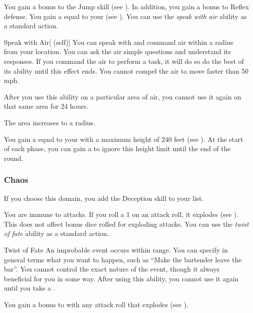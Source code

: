              You gain a  bonus to the Jump skill (see ).
            In addition, you gain a  bonus to Reflex defense.
             You gain a  equal to your  (see ).
             You can use the \textit{speak with air} ability as a standard action.
            \begin{attuneability}{Speak with Air}[ (self)]
                You can speak with and command air within a \areahuge radius  from your location.
                You can ask the air simple questions and understand its responses.
                If you command the air to perform a task, it will do so do the best of its ability until this effect ends.
                You cannot compel the air to move faster than 50 mph.

                After you use this ability on a particular area of air, you cannot use it again on that same area for 24 hours.

                \rankline
                 The area increases to a \areagarg radius.
            \end{attuneability}
             You gain a  equal to your  with a maximum height of 240 feet (see ).
            At the start of each phase, you can gain a  to ignore this height limit until the end of the round.

        \subsubsection{Chaos}
            If you choose this domain, you add the Deception skill to your  list.

             You are immune to  attacks.
             If you roll a 1 on an attack roll, it explodes (see ).
            This does not affect bonus dice rolled for exploding attacks.
             You can use the \textit{twist of fate} ability as a standard action.
            \begin{freeability}{Twist of Fate}
                An improbable event occurs within \rnglong range.
                You can specify in general terms what you want to happen, such as ``Make the bartender leave the bar''.
                You cannot control the exact nature of the event, though it always beneficial for you in some way.
                After using this ability, you cannot use it again until you take a .
            \end{freeability}
             You gain a  bonus to  with any attack roll that explodes (see ).

